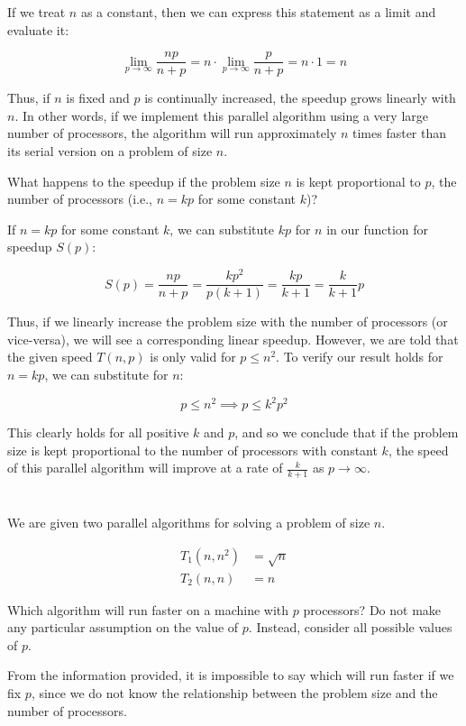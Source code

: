 \documentclass[twoside,10pt]{article}
\newcommand{\eqn}[1]{\begin{equation*}#1\end{equation*}}
\newcommand{\aln}[1]{\begin{align*}#1\end{align*}}
\begin{document}
\quad If we treat $n$ as a constant, then we can express this statement as a limit and evaluate it:

\eqn{\lim_{p \to \infty}{\dfrac{np}{n + p}} = n\cdot \lim_{p \to \infty}{\dfrac{p}{n + p}} = n \cdot 1 = n}

\quad Thus, if $n$ is fixed and $p$ is continually increased, the speedup grows linearly with $n$.
In other words, if we implement this parallel algorithm using a very large number of processors, the algorithm will run approximately $n$ times faster than its serial version on a problem of size $n$.

\hbox{}

What happens to the speedup if the problem size $n$ is kept proportional to $p$, the number of processors (i.e., $n = kp$ for some constant $k$)?

\quad If $n = kp$ for some constant $k$, we can substitute $kp$ for $n$ in our function for speedup $S(p)$:

\eqn{S(p) = \dfrac{np}{n + p} = \dfrac{kp^2}{p(k + 1)} = \dfrac{kp}{k + 1} = \dfrac{k}{k + 1}p}

\quad Thus, if we linearly increase the problem size with the number of processors (or vice-versa), we will see a corresponding linear speedup.
However, we are told that the given speed $T(n, p)$ is only valid for $p \leq n^2$.
To verify our result holds for $n = kp$, we can substitute for $n$:

\eqn{p \leq n^2 \implies p \leq k^2p^2}

\quad This clearly holds for all positive $k$ and $p$, and so we conclude that if the problem size is kept proportional to the number of processors with constant $k$, the speed of this parallel algorithm will improve at a rate of $\frac{k}{k+1}$ as $p \to \infty$.

\section{}

We are given two parallel algorithms for solving a problem of size $n$.

\aln{
T_1(n, n^2) &= \sqrt{n}\\
T_2(n, n) &= n
}

Which algorithm will run faster on a machine with $p$ processors?
Do not make any particular assumption on the value of $p$.
Instead, consider all possible values of $p$.

\hbox{}

\quad From the information provided, it is impossible to say which will run faster if we fix $p$, since we do not know the relationship between the problem size and the number of processors.
\end{document}

